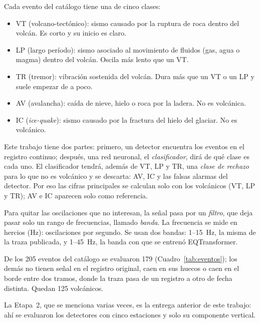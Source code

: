 \documentclass[11pt,a4paper,oneside,spanish,oldfontcommands]{memoir}
\begin{document}
Cada evento del catálogo tiene una de cinco clases:

\begin{itemize}
\item VT (volcano-tectónico): sismo causado por la ruptura de roca
  dentro del volcán. Es corto y su inicio es claro.
\item LP (largo período): sismo asociado al movimiento de fluidos
  (gas, agua o magma) dentro del volcán. Oscila más lento que un VT.
\item TR (tremor): vibración sostenida del volcán. Dura más que un VT
  o un LP y suele empezar de a poco.
\item AV (avalancha): caída de nieve, hielo o roca por la ladera. No es
  volcánica.
\item IC (\emph{ice-quake}): sismo causado por la fractura del hielo
  del glaciar. No es volcánico.
\end{itemize}

Este trabajo tiene dos partes: primero, un detector encuentra los eventos en el
registro continuo; después, una red neuronal, el \emph{clasificador}, dirá de
qué clase es cada uno. El clasificador tendrá, además de VT, LP y TR, una
\emph{clase de rechazo} para lo que no es volcánico y se descarta: AV, IC y las
falsas alarmas del detector. Por eso las cifras principales se calculan solo con
los volcánicos (VT, LP y TR); AV e IC aparecen solo como referencia.

Para quitar las oscilaciones que no interesan, la señal pasa por un
\emph{filtro}, que deja pasar solo un rango de frecuencias, llamado
\emph{banda}. La frecuencia se mide en hercios (Hz): oscilaciones por segundo.
Se usan dos bandas: 1--15~Hz, la misma de la traza publicada, y 1--45~Hz, la banda
con que se entrenó EQTransformer.

De los 205 eventos del catálogo se evaluaron 179 (Cuadro~\ref{tab:eventos}); los
demás no tienen señal en el registro original, caen en sus huecos o caen en el
borde entre dos tramos, donde la traza pasa de un registro a otro de fecha
distinta. Quedan 125 volcánicos.

La Etapa~2, que se menciona varias veces, es la entrega anterior de este
trabajo: ahí se evaluaron los detectores con cinco estaciones y solo su
componente vertical.
\end{document}
